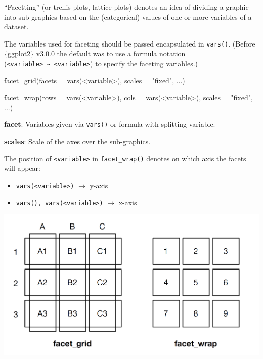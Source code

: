 \documentclass[]{book}
\newenvironment{Shaded}{}{}
\newcommand{\DataTypeTok}[1]{#1}
\newcommand{\KeywordTok}[1]{\textcolor[rgb]{0.00,0.00,1.00}{#1}}
\newcommand{\NormalTok}[1]{#1}
\newcommand{\OperatorTok}[1]{#1}
\newcommand{\StringTok}[1]{\textcolor[rgb]{0.00,0.50,0.50}{#1}}
\begin{document}
``Facetting'' (or trellis plots, lattice plots) denotes an idea of dividing a graphic into sub-graphics based on the (categorical) values of one or more variables of a dataset.

The variables used for faceting should be passed encapsulated in \texttt{vars()}.
(Before \{ggplot2\} v3.0.0 the default was to use a formula notation (\texttt{\textless{}variable\textgreater{}\ \textasciitilde{}\ \textless{}variable\textgreater{}}) to specify the faceting variables.)

\begin{Shaded}
\begin{Highlighting}[]
\KeywordTok{facet_grid}\NormalTok{(}\DataTypeTok{facets =} \KeywordTok{vars}\NormalTok{(}\OperatorTok{<}\NormalTok{variable}\OperatorTok{>}\NormalTok{), }
           \DataTypeTok{scales =} \StringTok{"fixed"}\NormalTok{, }
\NormalTok{           ...)}

\KeywordTok{facet_wrap}\NormalTok{(}\DataTypeTok{rows =} \KeywordTok{vars}\NormalTok{(}\OperatorTok{<}\NormalTok{variable}\OperatorTok{>}\NormalTok{), }
           \DataTypeTok{cols =} \KeywordTok{vars}\NormalTok{(}\OperatorTok{<}\NormalTok{variable}\OperatorTok{>}\NormalTok{), }
           \DataTypeTok{scales =} \StringTok{"fixed"}\NormalTok{, }
\NormalTok{           ...)}
\end{Highlighting}
\end{Shaded}

\textbf{facet}: Variables given via \texttt{vars()} or formula with splitting variable.

\textbf{scales}: Scale of the axes over the sub-graphics.

The position of \texttt{\textless{}variable\textgreater{}} in \texttt{facet\_wrap()} denotes on which axis the facets will appear:

\begin{itemize}
\item
  \texttt{vars(\textless{}variable\textgreater{})} \(\rightarrow\) y-axis
\item
  \texttt{vars(),\ vars(\textless{}variable\textgreater{})} \(\rightarrow\) x-axis
\end{itemize}

\includegraphics{img/facets.png}
\end{document}
